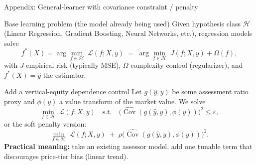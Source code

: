 \documentclass[aspectratio=169,10pt]{beamer}
\newcommand{\Cov}{\operatorname{Cov}}
\newcommand{\yh}{\hat y}
\newcommand{\phii}{\phi}
\begin{document}


\begin{frame}{\color{white} Appendix: General-learner with covariance constraint / penalty}
\vspace{-2mm}
\begin{block}{Base learning problem (the model already being used)}
Given hypothesis class \(\mathcal{H}\) (Linear Regression, Gradient Boosting, Neural Networks, etc.), regression models solve
\[
f^*(X)=\arg\min_{f\in\mathcal{H}} \; \mathcal{L}(f;X,y)
\;=\;
\arg\min_{f\in\mathcal{H}} \; J(f;X,y) + \Omega(f),
\]
with \(J\) empirical risk (typically MSE), \(\Omega\) complexity control (regularizer), and $f^*(X) = \hat{y}$ the estimator.
\end{block}

\begin{block}{Add a vertical-equity dependence control}
Let \(g(\yh,y)\) be some assessment ratio proxy and \(\phii(y)\) a value transform of the market value. We solve
\vspace{-2mm}
\[
\min_{f\in\mathcal{H}} \; \mathcal{L}(f;X,y)
\quad\text{s.t.}\quad
\big(\widehat{\Cov}(g(\yh,y),\phii(y))\big)^2 \le \varepsilon,
\]
or the soft penalty version:
\vspace{-2mm}
\[
\min_{f\in\mathcal{H}} \; \mathcal{L}(f;X,y)
\;+\;
\rho\big(\widehat{\Cov}(g(\yh,y),\phii(y))\big)^2.
\]
\footnotesize \textbf{Practical meaning:} take an existing assessor model, add one tunable term that discourages price-tier bias (linear trend).
\end{block}
\end{frame}
\end{document}
